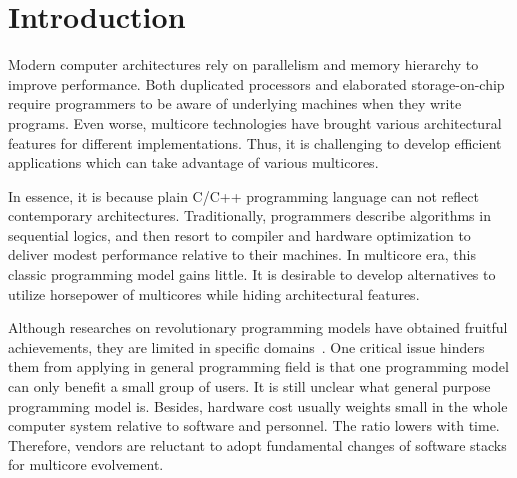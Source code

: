 \section{Introduction}\label{sec:Intro}
Modern computer architectures rely on parallelism and memory
hierarchy to improve performance. Both duplicated processors and
elaborated storage-on-chip require programmers to be aware of underlying
machines when they write programs. Even worse,
multicore technologies have brought various architectural features for
different implementations. Thus, it is challenging to develop
efficient applications which can take advantage of various multicores.

In essence, it is because plain C/C++ programming language
can not reflect contemporary architectures. Traditionally, programmers
describe algorithms in sequential logics, and then resort to  compiler
and hardware optimization to deliver modest performance relative to
their machines. In multicore era, this classic programming model gains
little. It is desirable to develop alternatives to utilize horsepower
of multicores while hiding architectural features.

Although researches on revolutionary programming models have obtained
fruitful achievements, they are limited in specific domains~\cite{gmapreduce}.
One critical issue hinders them from applying in general programming
field is that one programming model can only
benefit a small group of users. It is still unclear what
general purpose programming model is. Besides, hardware cost usually weights
small in the whole computer system relative to software and
personnel. The ratio lowers with time. Therefore, vendors are
reluctant to adopt fundamental changes of software stacks for
multicore evolvement.



